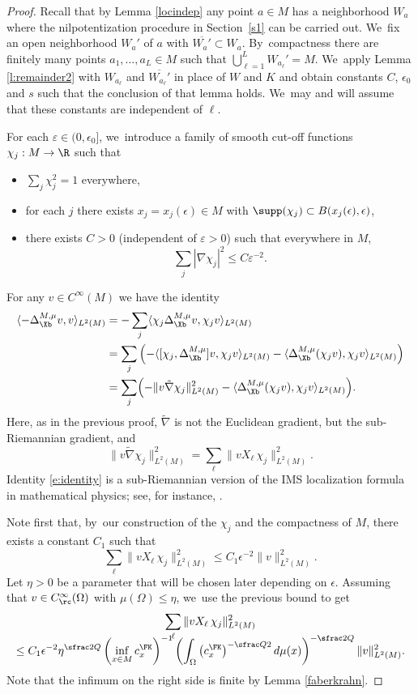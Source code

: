 \begin{proof}
Recall that by Lemma \ref{locindep} any point $a\in M$ has a neighborhood $W_a$ where the nilpotentization procedure in Section~\ref{s1} can be carried out. We~fix an open neighborhood $W_a'$ of $a$ with $\overline{W_a'}\subset W_a$. By~compactness there are finitely many points $a_1,\ldots,a_L\in M$ such that $\bigcup_{\ell=1}^L W_{a_\ell}' = M$. We~apply Lemma \ref{l:remainder2} with $W_{a_\ell}$ and $\overline{W_{a_\ell} '}$ in place of $W$ and $K$ and obtain constants $C$, $\epsilon_0$ and $s$ such that the conclusion of that lemma holds. We~may and will assume that these constants are independent of $\ell$.

For each $\varepsilon\in(0,\epsilon_0]$, we~introduce a family of smooth cut-off functions $\chi_j:M\to \R$ such that
\begin{itemize}
\item $\sum_j \chi_j^2= 1$ everywhere,
\item for each $j$ there exists $x_j = x_j(\epsilon)\in M$ with $\supp (\chi_j) \subset B(x_j(\epsilon),\epsilon)$,
\item there exists $C>0$ (independent of $\varepsilon>0$) such that everywhere in $M$,
\[
\sum_j |\nabla \chi_j|^2 \leq C \varepsilon^{-2}.
\]
\end{itemize}
For any $v\in C^\infty(M)$ we have the identity
\begin{align}\label{e:identity}
\langle -\Delta^{M,\mu}_\Xb v,v\rangle_{L^2(M)} & = - \sum_j \langle \chi_j \Delta^{M,\mu}_\Xb v,\chi_j v \rangle_{L^2(M)} \nonumber \\
&= \sum_j \left(- \langle [\chi_j,\Delta^{M,\mu}_\Xb]v,\chi_jv \rangle_{L^2(M)} - \langle \Delta^{M,\mu}_\Xb (\chi_jv), \chi_j v\rangle_{L^2(M)}\right) \nonumber \\
&=\sum_j \Bigl(- \| v \tilde \nabla\chi_j \|_{L^2(M)}^2 - \langle \Delta^{M,\mu}_\Xb (\chi_j v),\chi_j v \rangle_{L^2(M)} \Bigr).
\end{align}
Here, as in the previous proof, $\tilde \nabla$ is not the Euclidean gradient, but the sub-Riemannian gradient, and
\[
\| v\tilde \nabla\chi_j \|_{L^2(M)}^2 = \sum_{\ell} \| v X_\ell \,\chi_j \|_{L^2(M)}^2.
\]
Identity \eqref{e:identity} is a sub-Riemannian version of the IMS localization formula in mathematical physics; see, for instance, \cite[\S 3.1]{CyFrKiSi}.

Note first that, by~our construction of the $\chi_j$ and the compactness of $M$, there exists a constant $C_1$ such that
\[
\sum_{\ell} \| v X_\ell \,\chi_j \|_{L^2(M)}^2 \leq C_1 \epsilon^{-2} \|v\|_{L^2(M)}^2.
\]
Let $\eta>0$ be a parameter that will be chosen later depending on $\epsilon$. Assuming that $v\in C^\infty_\rc(\Omega)$ with $\mu(\Omega)\leq\eta$, we~use the previous bound to get
\begin{multline}
\label{eq:remainder1}
\sum_{\ell} \| v X_\ell \,\chi_j \|_{L^2(M)}^2\\[-8pt]
\leq C_1 \epsilon^{-2}
\eta^{\sfrac2Q} \left(\inf_{x\in M} c_x^\FK\right)^{-1}
\left(\int_\Omega \left(c^\FK_x\right)^{-\sfrac Q2} d\mu(x)\right)^{-\sfrac 2Q}
\|v\|_{L^2(M)}^2.
\end{multline}
Note that the infimum on the right side is finite by Lemma \ref{faberkrahn}.


\end{proof}
